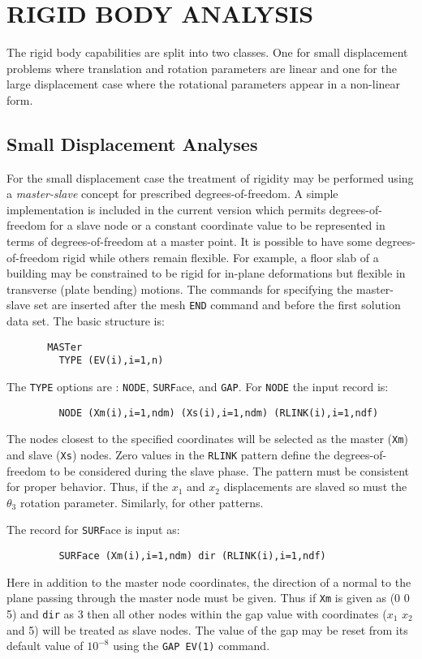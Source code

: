 \chapter[Rigid Body Analysis]{RIGID BODY ANALYSIS}
\label{rigid}

The rigid body capabilities are split into two classes.  One for small
displacement problems where translation and rotation parameters are
linear and one for the large displacement case where the rotational parameters
appear in a non-linear form.

\section{Small Displacement Analyses}

For the small displacement case the treatment of rigidity may be performed
using a {\it master-slave} concept for prescribed degrees-of-freedom.  A simple
implementation is included in the current version which permits
degrees-of-freedom for a slave node or a constant coordinate value to be
represented
in terms of degrees-of-freedom at a master point.  It is possible to have
some degrees-of-freedom rigid while others remain flexible.  For example,
a floor slab of a building may be constrained to be rigid for in-plane
deformations but flexible in transverse (plate bending) motions.  The commands
for specifying the master-slave set are inserted after the mesh {\tt END}
command and before the first solution data set.  The basic structure is:
\begin{verbatim}
       MASTer
         TYPE (EV(i),i=1,n)

\end{verbatim}
The {\tt TYPE} options are : {\tt NODE}, {\tt SURF}ace, and {\tt GAP}.  For
{\tt NODE} the input record is:
\begin{verbatim}
         NODE (Xm(i),i=1,ndm) (Xs(i),i=1,ndm) (RLINK(i),i=1,ndf)
\end{verbatim}
The nodes closest to the specified coordinates will be selected as the
master ({\tt Xm}) and slave ({\tt Xs}) nodes.  Zero values in
the {\tt RLINK} pattern define the degrees-of-freedom to be considered during
the slave phase.  The pattern must be consistent for proper behavior.  Thus,
if the $x_1$ and $x_2$ displacements are slaved so must the $\theta_3$
rotation parameter.  Similarly, for other patterns.

The record for {\tt SURF}ace is input as:
\begin{verbatim}
         SURFace (Xm(i),i=1,ndm) dir (RLINK(i),i=1,ndf)
\end{verbatim}
Here in addition to the master node coordinates, the direction of a normal
to the plane passing through the master node must be given.  Thus if
{\tt Xm} is given as (0 0 5) and {\tt dir} as 3 then all other nodes
within the gap value with coordinates ($x_1$ $x_2$ and 5) will be treated
as slave nodes.  The value of the gap may be reset from its default value
of $10^{-8}$ using the {\tt GAP EV(1)} command.

